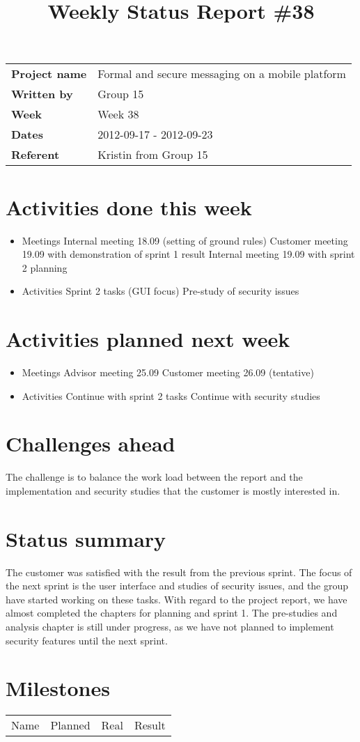 \documentclass[a4paper,12pt]{article}
\begin{document}
\title{Weekly Status Report \#38}
\maketitle
\begin{tabular}{>{\bfseries}l l}	
Project name&Formal and secure messaging on a mobile platform\\
Written by&Group 15\\
Week&Week 38\\
Dates&2012-09-17 - 2012-09-23\\
Referent&Kristin from Group 15\\
\end{tabular}

\section{Activities done this week}
\begin{itemize}
\item
Meetings
\subitem
Internal meeting 18.09 (setting of ground rules)
\subitem
Customer meeting 19.09 with demonstration of sprint 1 result
\subitem
Internal meeting 19.09 with sprint 2 planning
\item
Activities
\subitem
Sprint 2 tasks (GUI focus)
\subitem
Pre-study of security issues
\end{itemize}
\section{Activities planned next week}
\begin{itemize}
\item
Meetings
\subitem
Advisor meeting 25.09
\subitem
Customer meeting 26.09 (tentative)
\item
Activities
\subitem
Continue with sprint 2 tasks
\subitem
Continue with security studies
\end{itemize}
\section{Challenges ahead}
The challenge is to balance the work load between the report and the implementation and security studies that the customer is
mostly interested in.
\section{Status summary}
The customer was satisfied with the result from the previous sprint.
The focus of the next sprint is the user interface and studies of security issues, 
and the group have started working on these tasks.
\newline
\newline
With regard to the project report, we have almost completed the chapters for planning and sprint 1. The pre-studies and analysis
chapter is still under progress, as we have not planned to implement security features until the next sprint.
\section{Milestones}
\begin{tabular}{l l l l}	
Name&Planned&Real&Result
\end{tabular}
\end{document}
